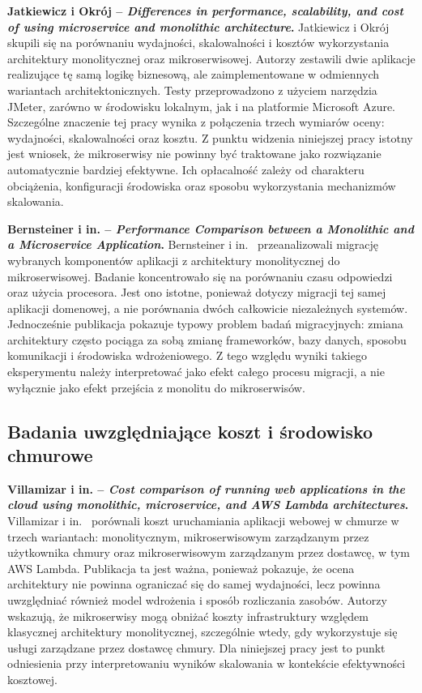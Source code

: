 \medskip

\noindent\textbf{Jatkiewicz i Okrój -- \textit{Differences in performance, scalability, and cost of using microservice and monolithic architecture}.}
Jatkiewicz i Okrój~\cite{okroj2023differences} skupili się na porównaniu wydajności, skalowalności i kosztów wykorzystania architektury monolitycznej oraz mikroserwisowej. Autorzy zestawili dwie aplikacje realizujące tę samą logikę biznesową, ale zaimplementowane w odmiennych wariantach architektonicznych. Testy przeprowadzono z użyciem narzędzia JMeter, zarówno w środowisku lokalnym, jak i na platformie Microsoft Azure. Szczególne znaczenie tej pracy wynika z połączenia trzech wymiarów oceny: wydajności, skalowalności oraz kosztu. Z punktu widzenia niniejszej pracy istotny jest wniosek, że mikroserwisy nie powinny być traktowane jako rozwiązanie automatycznie bardziej efektywne. Ich opłacalność zależy od charakteru obciążenia, konfiguracji środowiska oraz sposobu wykorzystania mechanizmów skalowania.

\medskip

\noindent\textbf{Bernsteiner i in. -- \textit{Performance Comparison between a Monolithic and a Microservice Application}.}
Bernsteiner i in.~\cite{bernsteiner2025performance} przeanalizowali migrację wybranych komponentów aplikacji z architektury monolitycznej do mikroserwisowej. Badanie koncentrowało się na porównaniu czasu odpowiedzi oraz użycia procesora. Jest ono istotne, ponieważ dotyczy migracji tej samej aplikacji domenowej, a nie porównania dwóch całkowicie niezależnych systemów. Jednocześnie publikacja pokazuje typowy problem badań migracyjnych: zmiana architektury często pociąga za sobą zmianę frameworków, bazy danych, sposobu komunikacji i środowiska wdrożeniowego. Z tego względu wyniki takiego eksperymentu należy interpretować jako efekt całego procesu migracji, a nie wyłącznie jako efekt przejścia z monolitu do mikroserwisów.

\subsection*{Badania uwzględniające koszt i środowisko chmurowe}

\noindent\textbf{Villamizar i in. -- \textit{Cost comparison of running web applications in the cloud using monolithic, microservice, and AWS Lambda architectures}.}
Villamizar i in.~\cite{villamizar2017cost} porównali koszt uruchamiania aplikacji webowej w chmurze w trzech wariantach: monolitycznym, mikroserwisowym zarządzanym przez użytkownika chmury oraz mikroserwisowym zarządzanym przez dostawcę, w tym AWS Lambda. Publikacja ta jest ważna, ponieważ pokazuje, że ocena architektury nie powinna ograniczać się do samej wydajności, lecz powinna uwzględniać również model wdrożenia i sposób rozliczania zasobów. Autorzy wskazują, że mikroserwisy mogą obniżać koszty infrastruktury względem klasycznej architektury monolitycznej, szczególnie wtedy, gdy wykorzystuje się usługi zarządzane przez dostawcę chmury. Dla niniejszej pracy jest to punkt odniesienia przy interpretowaniu wyników skalowania w kontekście efektywności kosztowej.

